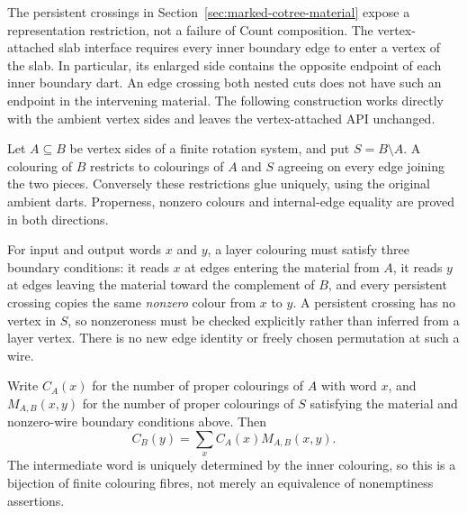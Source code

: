 The persistent crossings in Section~\ref{sec:marked-cotree-material}
expose a representation restriction, not a failure of Count composition.
The vertex-attached slab interface requires every inner boundary edge
to enter a vertex of the slab.  In particular, its enlarged side contains
the opposite endpoint of each inner boundary dart.
An edge crossing both nested cuts does not have such an endpoint in the
intervening material.  The following construction works directly with
the ambient vertex sides and leaves the vertex-attached API unchanged.

Let $A\subseteq B$ be vertex sides of a finite rotation system, and put
$S=B\setminus A$.  A colouring of $B$ restricts to colourings of $A$
and $S$ agreeing on every edge joining the two pieces.  Conversely these
restrictions glue uniquely, using the original ambient darts.  Properness,
nonzero colours and internal-edge equality are proved in both directions.

For input and output words $x$ and $y$, a layer colouring must satisfy
three boundary conditions: it reads $x$ at edges entering the material
from $A$, it reads $y$ at edges leaving the material toward the complement
of $B$, and every persistent crossing copies the same \emph{nonzero}
colour from $x$ to $y$.  A persistent crossing has no vertex in $S$,
so nonzeroness must be checked explicitly rather than inferred from a
layer vertex.  There is no new edge identity or freely chosen permutation
at such a wire.

\begin{theorem}
Write $C_A(x)$ for the number of proper colourings of $A$ with word $x$,
and $M_{A,B}(x,y)$ for the number of proper colourings of $S$ satisfying
the material and nonzero-wire boundary conditions above.  Then
\[
 C_B(y)=\sum_x C_A(x)M_{A,B}(x,y).
\]
The intermediate word is uniquely determined by the inner colouring,
so this is a bijection of finite colouring fibres, not merely an
equivalence of nonemptiness assertions.
\end{theorem}

